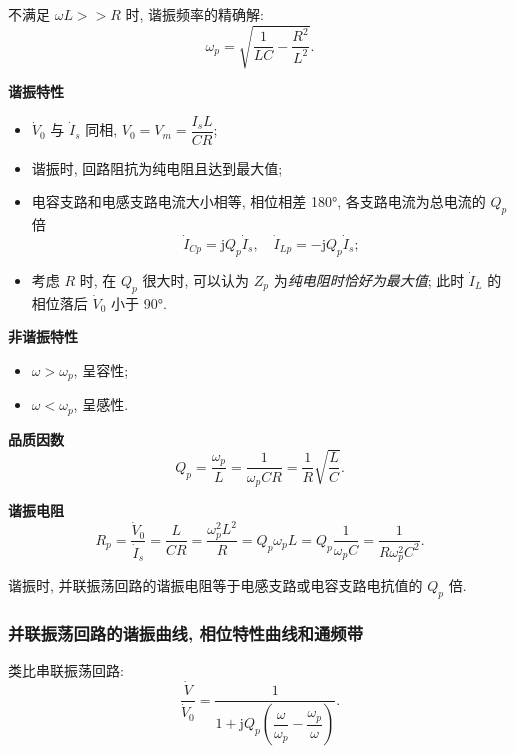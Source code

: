 不满足 $\omega L>>R$ 时, 谐振频率的精确解:
\begin{equation}
    \omega_p=\sqrt{\frac{1}{LC}-\frac{R^2}{L^2}}.
\end{equation}

\textbf{谐振特性}

\begin{itemize}
    \item $\dot{V}_0$ 与 $\dot{I}_s$ 同相, $V_0=V_m=\dfrac{I_sL}{CR}$;
    \item 谐振时, 回路阻抗为纯电阻且达到最大值;
    \item 电容支路和电感支路电流大小相等, 相位相差 180°, 各支路电流为总电流的 $Q_p$ 倍
          \begin{equation}
              \dot{I}_{Cp}=\mathrm{j}Q_p\dot{I}_s,\quad\dot{I}_{Lp}=-\mathrm{j}Q_p\dot{I}_s;
          \end{equation}
    \item 考虑 $R$ 时, 在 $Q_p$ 很大时, 可以认为 $Z_p$ 为\textit{纯电阻时恰好为最大值}; 此时 $\dot{I}_L$ 的相位落后 $\dot{V}_0$ 小于 90°.
\end{itemize}

\textbf{非谐振特性}

\begin{itemize}
    \item $\omega>\omega_p$, 呈容性;
    \item $\omega<\omega_p$, 呈感性.
\end{itemize}

\textbf{品质因数}
\begin{equation}
    Q_p=\frac{\omega_p}{L}=\frac{1}{\omega_pCR}=\frac{1}{R}\sqrt{\frac{L}{C}}.
\end{equation}

\textbf{谐振电阻}
\begin{equation}
    R_p=\frac{\dot{V}_0}{\dot{I}_s}=\frac{L}{CR}=\frac{\omega_p^2L^2}{R}=Q_p\omega_pL=Q_p\frac{1}{\omega_pC}=\frac{1}{R\omega_p^2C^2}.
\end{equation}

谐振时, 并联振荡回路的谐振电阻等于电感支路或电容支路电抗值的 $Q_p$ 倍.

\subsubsection{并联振荡回路的谐振曲线, 相位特性曲线和通频带}

类比串联振荡回路:
\begin{equation}
    \frac{\dot{V}}{\dot{V}_0}=\frac{1}{1+\mathrm{j}Q_p\left(\dfrac{\omega}{\omega_p}-\dfrac{\omega_p}{\omega}\right)}.
\end{equation}

